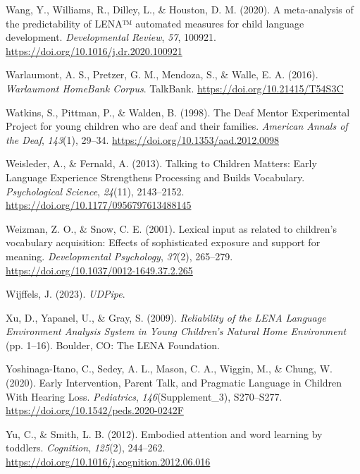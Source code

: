 \documentclass[
  man]{apa6}
\newlength{\cslhangindent}
\newlength{\cslentryspacingunit} %
\newenvironment{CSLReferences}[2] %
 {%
  \setlength{\parindent}{0pt}
  \ifodd #1
  \let\oldpar\par
  \def\par{\hangindent=\cslhangindent\oldpar}
  \fi
  \setlength{\parskip}{#2\cslentryspacingunit}
 }%
 {}
\begin{document}
\begin{CSLReferences}{1}{0}
\leavevmode{}%
Wang, Y., Williams, R., Dilley, L., \& Houston, D. M. (2020). A meta-analysis of the predictability of {LENA}™ automated measures for child language development. \emph{Developmental Review}, \emph{57}, 100921. \url{https://doi.org/10.1016/j.dr.2020.100921}

\leavevmode{}%
Warlaumont, A. S., Pretzer, G. M., Mendoza, S., \& Walle, E. A. (2016). \emph{Warlaumont {HomeBank Corpus}}. TalkBank. \url{https://doi.org/10.21415/T54S3C}

\leavevmode{}%
Watkins, S., Pittman, P., \& Walden, B. (1998). The {Deaf Mentor Experimental Project} for young children who are deaf and their families. \emph{American Annals of the Deaf}, \emph{143}(1), 29--34. \url{https://doi.org/10.1353/aad.2012.0098}

\leavevmode{}%
Weisleder, A., \& Fernald, A. (2013). Talking to {Children Matters}: {Early Language Experience Strengthens Processing} and {Builds Vocabulary}. \emph{Psychological Science}, \emph{24}(11), 2143--2152. \url{https://doi.org/10.1177/0956797613488145}

\leavevmode{}%
Weizman, Z. O., \& Snow, C. E. (2001). Lexical input as related to children's vocabulary acquisition: Effects of sophisticated exposure and support for meaning. \emph{Developmental Psychology}, \emph{37}(2), 265--279. \url{https://doi.org/10.1037/0012-1649.37.2.265}

\leavevmode{}%
Wijffels, J. (2023). \emph{{UDPipe}}.

\leavevmode{}%
Xu, D., Yapanel, U., \& Gray, S. (2009). \emph{Reliability of the {LENA Language Environment Analysis System} in {Young Children}'s {Natural Home Environment}} (pp. 1--16). Boulder, CO: The LENA Foundation.

\leavevmode{}%
Yoshinaga-Itano, C., Sedey, A. L., Mason, C. A., Wiggin, M., \& Chung, W. (2020). Early {Intervention}, {Parent Talk}, and {Pragmatic Language} in {Children With Hearing Loss}. \emph{Pediatrics}, \emph{146}(Supplement\_3), S270--S277. \url{https://doi.org/10.1542/peds.2020-0242F}

\leavevmode{}%
Yu, C., \& Smith, L. B. (2012). Embodied attention and word learning by toddlers. \emph{Cognition}, \emph{125}(2), 244--262. \url{https://doi.org/10.1016/j.cognition.2012.06.016}

\end{CSLReferences}
\end{document}
